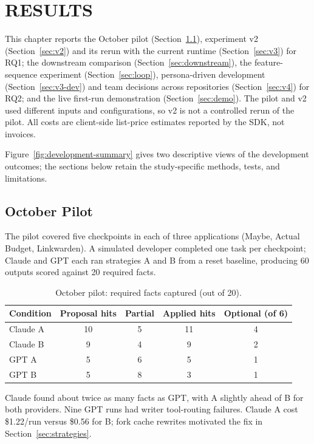 \chapter{RESULTS}
\label{ch:results}

This chapter reports the October pilot (Section~\ref{sec:pilot}), experiment v2 (Section~\ref{sec:v2}) and its rerun with the current runtime (Section~\ref{sec:v3}) for RQ1; the downstream comparison (Section~\ref{sec:downstream}), the feature-sequence experiment (Section~\ref{sec:loop}), persona-driven development (Section~\ref{sec:v3-dev}) and team decisions across repositories (Section~\ref{sec:v4}) for RQ2; and the live first-run demonstration (Section~\ref{sec:demo}). The pilot and v2 used different inputs and configurations, so v2 is not a controlled rerun of the pilot. All costs are client-side list-price estimates reported by the SDK, not invoices.

Figure~\ref{fig:development-summary} gives two descriptive views of the development outcomes; the sections below retain the study-specific methods, tests, and limitations.


\section{October Pilot}
\label{sec:pilot}

The pilot covered five checkpoints in each of three applications (Maybe, Actual Budget, Linkwarden). A simulated developer completed one task per checkpoint; Claude and GPT each ran strategies A and B from a reset baseline, producing 60 outputs scored against 20 required facts.

\begin{table}[htbp]
\centering
\caption{October pilot: required facts captured (out of 20).}
\label{tab:pilot}
\small
\begin{tabular}{@{}lcccc@{}}
\toprule
Condition & Proposal hits & Partial & Applied hits & Optional (of 6) \\
\midrule
Claude A & 10 & 5 & 11 & 4 \\
Claude B & 9 & 4 & 9 & 2 \\
GPT A & 5 & 6 & 5 & 1 \\
GPT B & 5 & 8 & 3 & 1 \\
\bottomrule
\end{tabular}
\end{table}

Claude found about twice as many facts as GPT, with A slightly ahead of B for both providers. Nine GPT runs had writer tool-routing failures. Claude A cost \$1.22/run versus \$0.56 for B; fork cache rewrites motivated the fix in Section~\ref{sec:strategies}.

